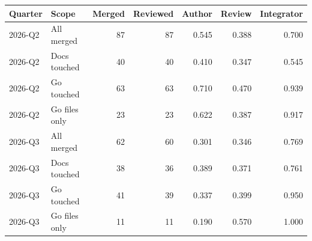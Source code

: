\begin{tabular}{llrrrrr}
\toprule
Quarter & Scope & Merged & Reviewed & Author & Review & Integrator \\
\midrule
2026-Q2 & All merged & 87 & 87 & 0.545 & 0.388 & 0.700 \\
2026-Q2 & Docs touched & 40 & 40 & 0.410 & 0.347 & 0.545 \\
2026-Q2 & Go touched & 63 & 63 & 0.710 & 0.470 & 0.939 \\
2026-Q2 & Go files only & 23 & 23 & 0.622 & 0.387 & 0.917 \\
2026-Q3 & All merged & 62 & 60 & 0.301 & 0.346 & 0.769 \\
2026-Q3 & Docs touched & 38 & 36 & 0.389 & 0.371 & 0.761 \\
2026-Q3 & Go touched & 41 & 39 & 0.337 & 0.399 & 0.950 \\
2026-Q3 & Go files only & 11 & 11 & 0.190 & 0.570 & 1.000 \\
\bottomrule
\end{tabular}

